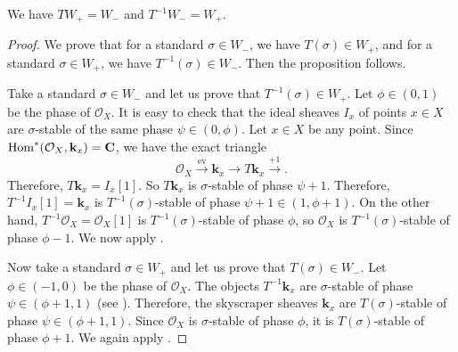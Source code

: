 \documentclass{amsart}
\begin{document}
\begin{proposition}\label{prop:T12}
  We have \(T W_+ = W_{-}\) and \(T^{-1} W_- = W_{+}\).
\end{proposition}
\begin{proof}
  We prove that for a standard \(\sigma \in W_-\), we have \(T(\sigma) \in W_{+}\), and for a standard \(\sigma \in W_{+}\), we have \(T^{-1}(\sigma) \in W_-\).
  Then the proposition follows.
  
  Take a standard \(\sigma \in W_-\)  and let us prove that \(T^{-1}(\sigma) \in W_{+}\).
  Let \(\phi \in (0,1)\) be the phase of \(\mathcal{O}_X\).
  It is easy to check that the ideal sheaves \(I_x\) of points \(x \in X\) are \(\sigma\)-stable of the same phase \(\psi \in (0,\phi)\).
  Let \(x \in X\) be any point.
  Since \(\operatorname{Hom}^{*}(\mathcal{O}_X, \mathbf{k}_x) = \mathbf{C}\), we have the exact triangle
  \[ \mathcal{O}_X \xrightarrow{\textrm{ev}} \mathbf{k}_x \to T \mathbf{k}_x \xrightarrow{+1}.\]
  Therefore, \( T \mathbf{k}_x = I_x[1]\).
  So \(T \mathbf{k}_x\) is \(\sigma\)-stable of phase \(\psi+1\).
  Therefore, \(T^{-1}I_x [1] = \mathbf{k}_x\) is \(T^{-1}(\sigma)\)-stable of phase \(\psi + 1 \in (1, \phi+1)\).
  On the other hand, \(T^{-1} \mathcal{O}_X = \mathcal{O}_X[1]\) is \(T^{-1}(\sigma)\)-stable of phase \(\phi\), so \(\mathcal{O}_X\) is \(T^{-1}(\sigma)\)-stable of phase \(\phi-1\).
  We now apply .

  Now take a standard \(\sigma \in W_+\)  and let us prove that \(T(\sigma) \in W_{-}\).
  Let \(\phi \in (-1,0)\)  be the phase of \(\mathcal{O}_{X}\).
  The objects \(T^{-1} \mathbf{k}_x\) are \(\sigma\)-stable of phase \(\psi \in (\phi+1,1)\)  (see \cite[Remark~4.3 (i)]{huy.mac.ste:08}).
  Therefore, the skyscraper sheaves \(\mathbf{k}_x\) are \(T(\sigma)\)-stable of phase \(\psi \in (\phi+1,1)\).
  Since \(\mathcal{O}_X\) is \(\sigma\)-stable of phase \(\phi\), it is \(T(\sigma)\)-stable of phase \(\phi+1\).
  We again apply .
\end{proof}
\end{document}
